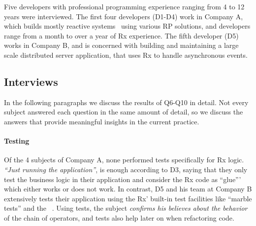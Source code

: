 Five developers with professional programming experience ranging from 4
to 12 years were interviewed.  The first four developers (D1-D4) work
in Company A, which builds mostly reactive systems~\cite{boner2014reactive}
using various RP solutions, and developers range from a month to over a
year of Rx experience.  The fifth developer (D5) works in Company B, and
is concerned with building and maintaining a large scale distributed
server application, that uses Rx to handle asynchronous events.

\subsection{Interviews} In the following paragraphs we discuss the
results of Q6-Q10 in detail.  Not every subject answered each question
in the same amount of detail, so we discuss the answers that provide
meaningful insights in the current practice.

\paragraph{Testing} Of the 4 subjects of Company A, none performed tests
specifically for Rx logic.  \emph{``Just running the application''}, is
enough according to D3, saying that they only test the business logic in
their application and consider the Rx code as ``glue''' which either
works or does not work.  In contrast, D5 and his team at Company B
extensively tests their application using the Rx' built-in test
facilities like ``marble tests'' and the ~\cite{reactivex}.
Using tests, the subject \emph{confirms his believes about the behavior}
of the chain of operators, and tests also help later on when refactoring
code.

